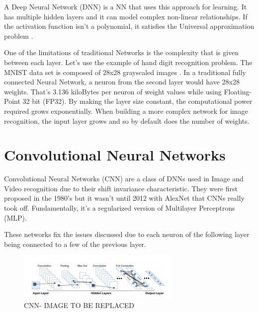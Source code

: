  A Deep Neural Network (DNN) is a NN that uses this approach for learning. It has multiple hidden layers and it can 
 model complex non-linear relationships. If the activation function isn't a polynomial, it satisfies
 the Universal approximation problem \cite{approximation:problem}.

One of the limitations of traditional Networks is the complexity that is given between each layer. Let's use the example of hand digit recognition problem.
The MNIST data set is composed of 28x28 grayscaled images \cite{mnist:digits}. In a traditional fully connected Neural Network, a neuron from the second layer
would have 28x28 weights. That's 3.136 kiloBytes per neuron of weight values while using Floating-Point 32 bit (FP32). 
By making the layer size constant, the computational power required grows exponentially.
When building a more complex network for image recognition, the input layer grows and so by default does the number of weights.



 \section{Convolutional Neural Networks}
 \label{section:subcnn}

 Convolutional Neural Networks (CNN) are a class of DNNs used in Image and Video recognition due to their shift invariance characteristic. They were first proposed in the 
 1980's but it wasn't until 2012 with AlexNet \cite{alexnet} 
 that CNNs really took off. Fundamentally,  it's a regularized version of Multilayer Perceptrons (MLP).

 These networks fix the issues discussed due to each neuron of the following layer being connected to a few of the previous layer.
 

 \begin{figure}[!htbp]
    \centering
    \includegraphics[width=0.7\textwidth]{Figures/convolutionlayer.png}
    \caption{CNN- IMAGE TO BE REPLACED}
    \label{CNNl}
\end{figure} 

